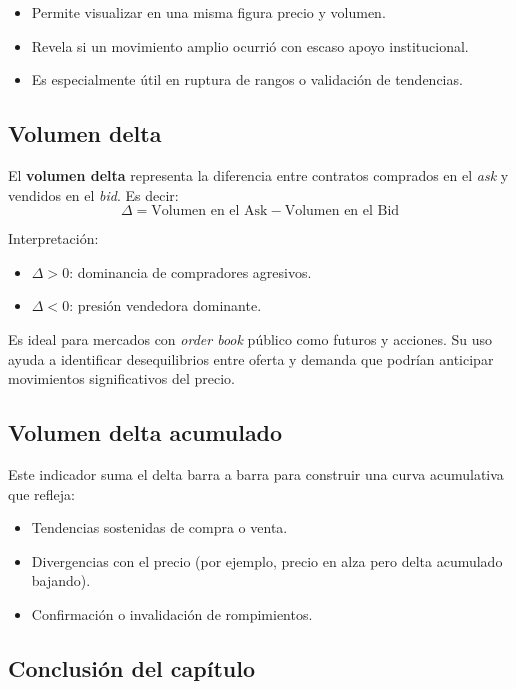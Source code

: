 \begin{itemize}
  \item Permite visualizar en una misma figura precio y volumen.
  \item Revela si un movimiento amplio ocurrió con escaso apoyo institucional.
  \item Es especialmente útil en ruptura de rangos o validación de tendencias.
\end{itemize}

\subsection*{Volumen delta}

El \textbf{volumen delta} representa la diferencia entre contratos comprados en el \textit{ask} y vendidos en el \textit{bid}. Es decir:
\[
\Delta = \text{Volumen en el Ask} - \text{Volumen en el Bid}
\]

Interpretación:
\begin{itemize}
  \item $\Delta > 0$: dominancia de compradores agresivos.
  \item $\Delta < 0$: presión vendedora dominante.
\end{itemize}

Es ideal para mercados con \textit{order book} público como futuros y acciones. Su uso ayuda a identificar desequilibrios entre oferta y demanda que podrían anticipar movimientos significativos del precio.

\subsection*{Volumen delta acumulado}

Este indicador suma el delta barra a barra para construir una curva acumulativa que refleja:
\begin{itemize}
  \item Tendencias sostenidas de compra o venta.
  \item Divergencias con el precio (por ejemplo, precio en alza pero delta acumulado bajando).
  \item Confirmación o invalidación de rompimientos.
\end{itemize}

\subsection*{Conclusión del capítulo}

